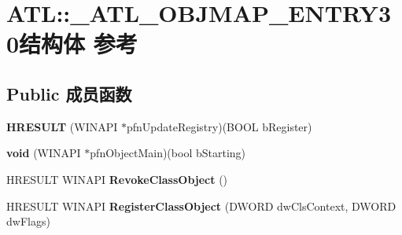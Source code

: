 \hypertarget{struct_a_t_l_1_1___a_t_l___o_b_j_m_a_p___e_n_t_r_y30}{}\section{A\+TL\+:\+:\+\_\+\+A\+T\+L\+\_\+\+O\+B\+J\+M\+A\+P\+\_\+\+E\+N\+T\+R\+Y30结构体 参考}
\label{struct_a_t_l_1_1___a_t_l___o_b_j_m_a_p___e_n_t_r_y30}
\subsection*{Public 成员函数}
\begin{DoxyCompactItemize}
\item 
\mbox{\label{struct_a_t_l_1_1___a_t_l___o_b_j_m_a_p___e_n_t_r_y30_aa047fe39f9104289d4d279c616e29d7e}} 
{\bfseries H\+R\+E\+S\+U\+LT} (W\+I\+N\+A\+PI $\ast$pfn\+Update\+Registry)(B\+O\+OL b\+Register)
\item 
\mbox{\label{struct_a_t_l_1_1___a_t_l___o_b_j_m_a_p___e_n_t_r_y30_ae4cf7702b2c9aa7bdc3c8af64581baf9}} 
{\bfseries void} (W\+I\+N\+A\+PI $\ast$pfn\+Object\+Main)(bool b\+Starting)
\item 
\mbox{\label{struct_a_t_l_1_1___a_t_l___o_b_j_m_a_p___e_n_t_r_y30_aee496527ff7d715279cb3e1d5105129f}} 
H\+R\+E\+S\+U\+LT W\+I\+N\+A\+PI {\bfseries Revoke\+Class\+Object} ()
\item 
\mbox{\label{struct_a_t_l_1_1___a_t_l___o_b_j_m_a_p___e_n_t_r_y30_a60fe8783aa973c1cd666f04a5f504807}} 
H\+R\+E\+S\+U\+LT W\+I\+N\+A\+PI {\bfseries Register\+Class\+Object} (D\+W\+O\+RD dw\+Cls\+Context, D\+W\+O\+RD dw\+Flags)
\end{DoxyCompactItemize}

